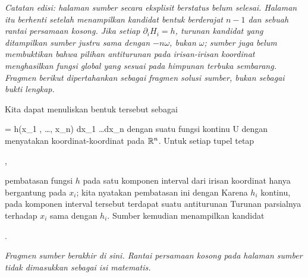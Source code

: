 \textit{Catatan edisi: halaman sumber secara eksplisit berstatus belum
selesai. Halaman itu berhenti setelah menampilkan kandidat bentuk
berderajat $n-1$ dan sebuah rantai persamaan kosong. Jika setiap
$\partial_iH_i=h$, turunan kandidat yang ditampilkan sumber justru sama
dengan $-n\omega$, bukan $\omega$; sumber juga belum membuktikan bahwa
pilihan antiturunan pada irisan-irisan koordinat menghasilkan fungsi global
yang sesuai pada himpunan terbuka sembarang. Fragmen berikut dipertahankan
sebagai fragmen solusi sumber, bukan sebagai bukti lengkap.}

Kita dapat menuliskan bentuk tersebut sebagai

\mavergleichskettedisp
{\vergleichskette
{ \omega
}
{ =} { h(x_1 , \ldots , x_n) dx_1 \wedge \ldots \wedge dx_n
}
{ } {
}
{ } {
}
{ } {
}
}
{}{}{}
dengan suatu fungsi kontinu
 { U } {\R
} {}
dengan
 menyatakan koordinat-koordinat pada ${\mathbb R}^n$.
Untuk setiap tupel tetap

 { , }

pembatasan fungsi $h$
pada satu komponen interval dari irisan koordinat hanya bergantung pada
$x_i$; kita nyatakan pembatasan ini dengan
Karena $h_i$ kontinu, pada komponen interval tersebut terdapat suatu
antiturunan
Turunan parsialnya terhadap $x_i$ sama dengan $h_i$. Sumber kemudian
menampilkan kandidat

 { . }

\textit{Fragmen sumber berakhir di sini. Rantai persamaan kosong pada
halaman sumber tidak dimasukkan sebagai isi matematis.}
